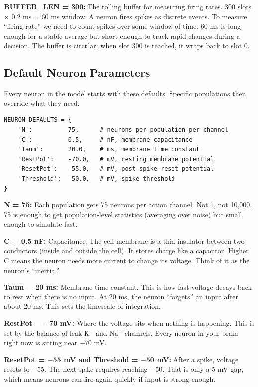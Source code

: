 \documentclass[11pt,a4paper]{article}
\begin{document}
\textbf{BUFFER\_LEN = 300:} The rolling buffer for measuring firing rates. 300 slots $\times$ 0.2 ms = 60 ms window. A neuron fires spikes as discrete events. To measure ``firing rate'' we need to count spikes over some window of time. 60 ms is long enough for a stable average but short enough to track rapid changes during a decision. The buffer is circular: when slot 300 is reached, it wraps back to slot 0.

\subsection{Default Neuron Parameters}

Every neuron in the model starts with these defaults. Specific populations then override what they need.

\begin{lstlisting}
NEURON_DEFAULTS = {
    'N':          75,      # neurons per population per channel
    'C':          0.5,     # nF, membrane capacitance
    'Taum':       20.0,    # ms, membrane time constant
    'RestPot':    -70.0,   # mV, resting membrane potential
    'ResetPot':   -55.0,   # mV, post-spike reset potential
    'Threshold':  -50.0,   # mV, spike threshold
}
\end{lstlisting}

\textbf{N = 75:} Each population gets 75 neurons per action channel. Not 1, not 10,000. 75 is enough to get population-level statistics (averaging over noise) but small enough to simulate fast.

\textbf{C = 0.5 nF:} Capacitance. The cell membrane is a thin insulator between two conductors (inside and outside the cell). It stores charge like a capacitor. Higher C means the neuron needs more current to change its voltage. Think of it as the neuron's ``inertia.''

\textbf{Taum = 20 ms:} Membrane time constant. This is how fast voltage decays back to rest when there is no input. At 20 ms, the neuron ``forgets'' an input after about 20 ms. This sets the timescale of integration.

\textbf{RestPot = $-$70 mV:} Where the voltage sits when nothing is happening. This is set by the balance of leak K$^+$ and Na$^+$ channels. Every neuron in your brain right now is sitting near $-$70 mV.

\textbf{ResetPot = $-$55 mV and Threshold = $-$50 mV:} After a spike, voltage resets to $-$55. The next spike requires reaching $-$50. That is only a 5 mV gap, which means neurons can fire again quickly if input is strong enough.
\end{document}
